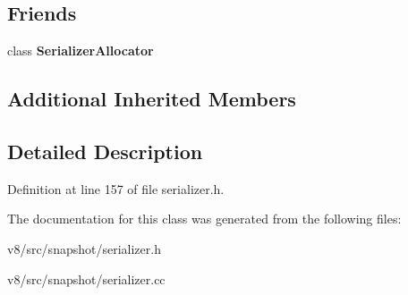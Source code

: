 \subsection*{Friends}
\begin{DoxyCompactItemize}
\item 
\mbox{\label{classv8_1_1internal_1_1Serializer_af4b359a77e908e48f44781bd5adf4cd3}} 
class {\bfseries Serializer\+Allocator}
\end{DoxyCompactItemize}
\subsection*{Additional Inherited Members}


\subsection{Detailed Description}


Definition at line 157 of file serializer.\+h.



The documentation for this class was generated from the following files\+:\begin{DoxyCompactItemize}
\item 
v8/src/snapshot/serializer.\+h\item 
v8/src/snapshot/serializer.\+cc\end{DoxyCompactItemize}
